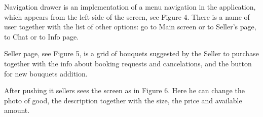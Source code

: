 \documentclass{scrreprt}
\begin{document}
\begin{figure}[h]
\begin{minipage}[h]{0.32\linewidth}
	\end{minipage}
\end{figure}

Navigation drawer is an implementation of a menu navigation in the application, which appears from the left side of the screen, see Figure 4. There is a name of user together with the list of other options: go to Main screen or to Seller's page, to Chat or to Info page.

Seller page, see Figure 5, is a grid of bouquets suggested by the Seller to purchase together with the info about booking requests and cancelations, and the button for new bouquets addition.

After pushing it sellers sees the screen as in Figure 6. Here he can change the photo of good, the description together with the size, the price and available amount.
\end{document}
